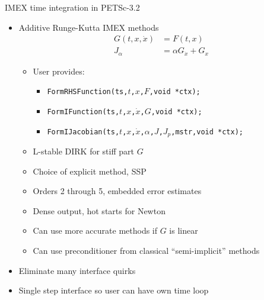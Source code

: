 \begin{frame}{IMEX time integration in PETSc-3.2}
  \begin{itemize}
  \item Additive Runge-Kutta IMEX methods
    \begin{align*}
      G(t,x,\dot x) &= F(t,x) \\
      J_\alpha &= \alpha G_{\dot x} + G_x
    \end{align*}
    \begin{itemize}
    \item User provides:
      \begin{itemize}
      \item \texttt{FormRHSFunction(ts,$t$,$x$,$F$,void *ctx);}
      \item \texttt{FormIFunction(ts,$t$,$x$,$\dot x$,$G$,void *ctx);}
      \item \texttt{FormIJacobian(ts,$t$,$x$,$\dot x$,$\alpha$,$J$,$J_{p}$,mstr,void *ctx);}
      \end{itemize}
    \item L-stable DIRK for stiff part $G$
    \item Choice of explicit method, \eg SSP
    \item Orders 2 through 5, embedded error estimates
    \item Dense output, hot starts for Newton
    \item Can use more accurate methods if $G$ is linear
    \item Can use preconditioner from classical ``semi-implicit'' methods
    \end{itemize}
  \item Eliminate many interface quirks
  \item Single step interface so user can have own time loop
  \end{itemize}
\end{frame}
